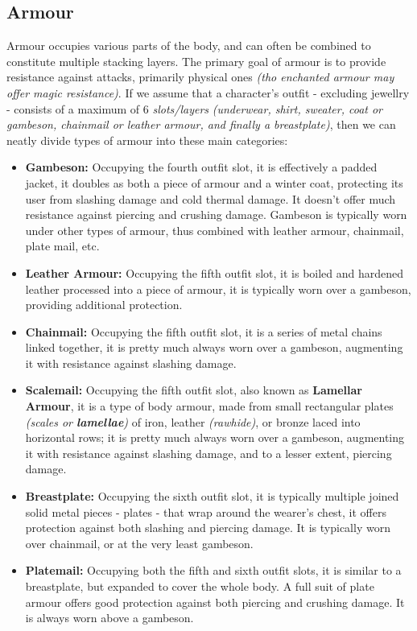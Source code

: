 \subsection{Armour}
Armour occupies various parts of the body, and can often be combined to constitute multiple stacking layers. The primary goal of armour is to provide resistance against attacks, primarily physical ones \textit{(tho enchanted armour may offer magic resistance)}. If we assume that a character's outfit - excluding jewellry - consists of a maximum of 6 \textit{slots/layers} \textit{(underwear, shirt, sweater, coat or gambeson, chainmail or leather armour, and finally a breastplate)}, then we can neatly divide types of armour into these main categories:
\begin{itemize}
\item \textbf{Gambeson:} Occupying the fourth outfit slot, it is effectively a padded jacket, it doubles as both a piece of armour and a winter coat, protecting its user from slashing damage and cold thermal damage. It doesn't offer much resistance against piercing and crushing damage. Gambeson is typically worn under other types of armour, thus combined with leather armour, chainmail, plate mail, etc.
\item \textbf{Leather Armour:} Occupying the fifth outfit slot, it is boiled and hardened leather processed into a piece of armour, it is typically worn over a gambeson, providing additional protection.
\item \textbf{Chainmail:} Occupying the fifth outfit slot, it is a series of metal chains linked together, it is pretty much always worn over a gambeson, augmenting it with resistance against slashing damage.
\item \textbf{Scalemail:} Occupying the fifth outfit slot, also known as \textbf{Lamellar Armour}, it is a type of body armour, made from small rectangular plates \textit{(scales or \textbf{lamellae})} of iron, leather \textit{(rawhide)}, or bronze laced into horizontal rows; it is pretty much always worn over a gambeson, augmenting it with resistance against slashing damage, and to a lesser extent, piercing damage.
\item \textbf{Breastplate:} Occupying the sixth outfit slot, it is typically multiple joined solid metal pieces - plates - that wrap around the wearer's chest, it offers protection against both slashing and piercing damage. It is typically worn over chainmail, or at the very least gambeson.
\item \textbf{Platemail:} Occupying both the fifth and sixth outfit slots, it is similar to a breastplate, but expanded to cover the whole body. A full suit of plate armour offers good protection against both piercing and crushing damage. It is always worn above a gambeson.
\end{itemize}
